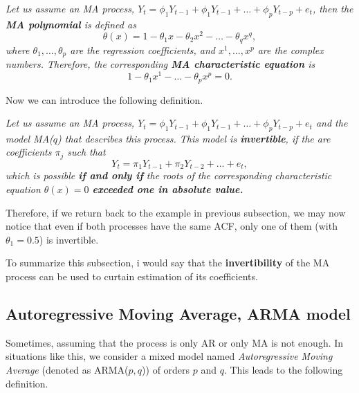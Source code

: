 \begin{definition}
\textit{Let us assume an MA process, $Y_t = \phi_{1}Y_{t-1} + \phi_{1}Y_{t-1} + \ldots + \phi_{p}Y_{t-p} + e_t$, then the \textbf{MA polynomial} is defined as \begin{equation}
    \theta(x) = 1 - \theta_{1}x - \theta_{2}x^2 - \ldots - \theta_{q}x^{q},
    \label{eq_ma_polynomial}
\end{equation} where $\theta_1, \ldots, \theta_p$ are the regression coefficients, and $x^1, \ldots, x^p$ are the complex numbers.
Therefore, the corresponding \textbf{MA characteristic equation} is \begin{equation}
    1 - \theta_{1}x^{1} - \ldots - \theta_{p}x^{p} = 0.
    \label{eq_ma_pol_eq}
\end{equation}}
\label{def_ma_char_polynomial}
\end{definition}

Now we can introduce the following definition.

\begin{definition}
\textit{Let us assume an MA process, $Y_t = \phi_{1}Y_{t-1} + \phi_{1}Y_{t-1} + \ldots + \phi_{p}Y_{t-p} + e_t$ and the model MA($q$) that describes this process. This model is \textbf{invertible}, if the are coefficients $\pi_j$ such that
\begin{equation}
    Y_t = \pi_{1}Y_{t-1} + \pi_{2}Y_{t-2} + \ldots + e_t,
\end{equation}
which is possible \textbf{if and only if} the roots of the corresponding characteristic equation $\theta(x) = 0$ \textbf{exceeded one in absolute value.}
\label{def_ma_invertibility}}
\end{definition}

Therefore, if we return back to the example in previous subsection, we may now notice that even if both processes have the same ACF, only one of them (with $\theta_1 = 0.5$) is invertible. 

To summarize this subsection, i would say that the \textbf{invertibility} of the MA process can be used to curtain estimation of its coefficients.

\subsection{Autoregressive Moving Average, ARMA model}

Sometimes, assuming that the process is only AR or only MA is not enough. In situations like this, we consider a mixed model named \textit{Autoregressive Moving Average} (denoted as ARMA($p, q$)) of orders $p$ and $q$. This leads to the following definition.

